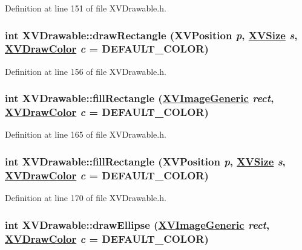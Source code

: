 Definition at line 151 of file XVDrawable.h.\label{XVDrawable_a5}
\hypertarget{class_XVDrawable_a5}{
\subsubsection[drawRectangle]{\setlength{\rightskip}{0pt plus 5cm}int XVDrawable::draw\-Rectangle (XVPosition {\em p}, \hyperlink{class_XVSize}{XVSize} {\em s}, \hyperlink{class_XVDrawColor}{XVDraw\-Color} {\em c} = DEFAULT\_\-COLOR)}}




Definition at line 156 of file XVDrawable.h.\label{XVDrawable_a7}
\hypertarget{class_XVDrawable_a7}{
\subsubsection[fillRectangle]{\setlength{\rightskip}{0pt plus 5cm}int XVDrawable::fill\-Rectangle (\hyperlink{class_XVImageGeneric}{XVImage\-Generic} {\em rect}, \hyperlink{class_XVDrawColor}{XVDraw\-Color} {\em c} = DEFAULT\_\-COLOR)}}




Definition at line 165 of file XVDrawable.h.\label{XVDrawable_a8}
\hypertarget{class_XVDrawable_a8}{
\subsubsection[fillRectangle]{\setlength{\rightskip}{0pt plus 5cm}int XVDrawable::fill\-Rectangle (XVPosition {\em p}, \hyperlink{class_XVSize}{XVSize} {\em s}, \hyperlink{class_XVDrawColor}{XVDraw\-Color} {\em c} = DEFAULT\_\-COLOR)}}




Definition at line 170 of file XVDrawable.h.\label{XVDrawable_a10}
\hypertarget{class_XVDrawable_a10}{
\subsubsection[drawEllipse]{\setlength{\rightskip}{0pt plus 5cm}int XVDrawable::draw\-Ellipse (\hyperlink{class_XVImageGeneric}{XVImage\-Generic} {\em rect}, \hyperlink{class_XVDrawColor}{XVDraw\-Color} {\em c} = DEFAULT\_\-COLOR)}}




